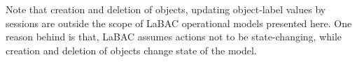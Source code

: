 Note that creation and deletion of objects, updating object-label values by sessions are outside the scope of LaBAC operational models presented here. One reason behind is that, LaBAC assumes actions not to be state-changing, while creation and deletion of objects change state of the model.











